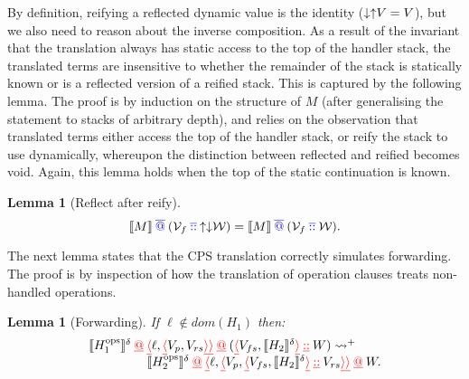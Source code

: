 \documentclass[12pt,phd,lfcs,twoside,openright,logo,leftchapter,normalheadings]{infthesis}
\theoremstyle{plain}
\newtheorem{lemma}[theorem]{Lemma}
\theoremstyle{definition}
\begin{document}
%
By definition, reifying a reflected dynamic value is the identity
($\mathord{\downarrow} \mathord{\uparrow} V = V$), but we also need to reason about the
inverse composition. As a result of the invariant that the translation
always has static access to the top of the handler stack, the
translated terms are insensitive to whether the remainder of the stack
is statically known or is a reflected version of a reified stack. This
is captured by the following lemma. The proof is by induction on the
structure of $M$ (after generalising the statement to stacks of
arbitrary depth), and relies on the observation that translated terms
either access the top of the handler stack, or reify the stack to use
dynamically, whereupon the distinction between reflected and reified
becomes void. Again, this lemma holds when the top of the static
continuation is known.
%
\begin{lemma}[Reflect after reify]
  \label{lem:reflect-after-reify-gen-cont}
%
  \[
    \llbracket M \rrbracket \mathbin{{\color{blue}\overline{@}}} (\mathcal{V}_f \mathbin{{\color{blue}\overline{::}}} \mathord{\uparrow} \mathord{\downarrow} \mathcal{W})
  =
  \llbracket M \rrbracket \mathbin{{\color{blue}\overline{@}}} (\mathcal{V}_f \mathbin{{\color{blue}\overline{::}}} \mathcal{W}).
  \]
\end{lemma}

The next lemma states that the CPS translation correctly simulates
forwarding. The proof is by inspection of how the translation of
operation clauses treats non-handled operations.
%
\begin{lemma}[Forwarding]\label{lem:forwarding-gen-cont}
  If $\ell \notin dom(H_1)$ then:
  \[
    \bl
    \cps{\hops_1}^\delta \dapp \dRecord{\ell, \dRecord{V_p, V_{\dhkr}}} \dapp (\dRecord{V_{fs}, \cps{H_2}^\delta} \dcons W)
    \reducesto^+ \qquad \\
    \hfill
       \cps{\hops_2}^\delta \dapp \dRecord{\ell, \dRecord{V_p, \dRecord{V_{fs}, \cps{H_2}^\delta} \dcons V_{\dhkr}}} \dapp W. \\
    \el
  \]
\end{lemma}
\end{document}
